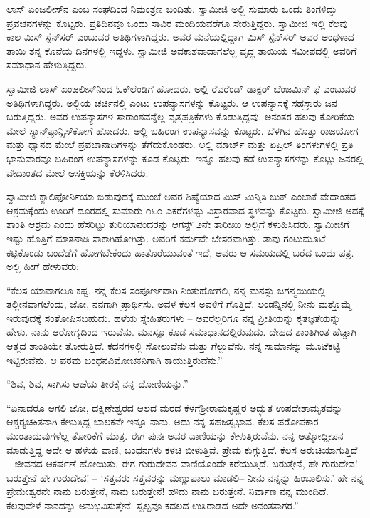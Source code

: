  ಲಾಸ್ ಏಂಜಲೀಸ್‍ನ  ಎಂಬ ಸಂಘದಿಂದ ನಿಮಂತ್ರಣ ಬಂದಿತು. ಸ್ವಾಮೀಜಿ ಅಲ್ಲಿ ಸುಮಾರು ಒಂದು ತಿಂಗಳಿದ್ದು ಪ್ರವಚನಗಳನ್ನು ಕೊಟ್ಟರು. ಪ್ರತಿದಿನವೂ ಒಂದು ಸಾವಿರ ಮಂದಿಯವರೆಗೂ ಸೇರುತ್ತಿದ್ದರು. ಸ್ವಾಮೀಜಿ ಇಲ್ಲಿ ಕೆಲವು ಕಾಲ ಮಿಸ್ ಸ್ಪೆನ್‍ಸರ್ ಎಂಬುವರ ಅತಿಥಿಗಳಾಗಿದ್ದರು. ಅವರ ಮನೆಯಲ್ಲಿದ್ದಾಗ ಮಿಸ್ ಸ್ಪೆನ್‍ಸರ್ ಅವರ ಅಂಧಳಾದ ತಾಯಿ ತನ್ನ ಕೊನೆಯ ದಿನಗಳಲ್ಲಿ ಇದ್ದಳು. ಸ್ವಾಮೀಜಿ ಅವಕಾಶವಾದಾಗಲೆಲ್ಲ ವೃದ್ಧ ತಾಯಿಯ ಸಮೀಪದಲ್ಲಿ ಅವರಿಗೆ ಸಮಾಧಾನ ಹೇಳುತ್ತಿದ್ದರು. 

 ಸ್ವಾಮೀಜಿ ಲಾಸ್ ಏಂಜಲೀಸ್‍ನಿಂದ ಓಕ್‍ಲೆಂಡಿಗೆ ಹೋದರು. ಅಲ್ಲಿ ರೆವರೆಂಡ್ ಡಾಕ್ಟರ್ ಬೆಂಜಮಿನ್ ಫೆ ಎಂಬುವರ ಅತಿಥಿಗಳಾಗಿದ್ದರು. ಅಲ್ಲಿಯ ಚರ್ಚಿನಲ್ಲಿ ಎಂಟು ಉಪನ್ಯಾಸಗಳನ್ನು ಕೊಟ್ಟರು. ಆ ಉಪನ್ಯಾಸಕ್ಕೆ ಸಹಸ್ರಾರು ಜನ ಬರುತ್ತಿದ್ದರು. ಅವರ ಉಪನ್ಯಾಸಗಳ ಸಾರಾಂಶವನ್ನೆಲ್ಲ ವೃತ್ತಪತ್ರಿಕೆಗಳು ಕೊಡುತ್ತಿದ್ದವು. ಅನಂತರ ಹಲವು ಕೋರಿಕೆಯ ಮೇಲೆ ಸ್ಯಾನ್‍ಫ್ರಾನ್ಸಿಸ್‍ಕೋಗೆ ಹೋದರು. ಅಲ್ಲಿ ಬಹಿರಂಗ ಉಪನ್ಯಾಸವನ್ನು ಕೊಟ್ಟರು. ಬೆಳಗಿನ ಹೊತ್ತು ರಾಜಯೋಗ ಮತ್ತು ಧ್ಯಾನದ ಮೇಲೆ ಪ್ರವಚಾನಾದಿಗಳನ್ನು ತೆಗೆದುಕೊಂಡರು. ಅಲ್ಲಿ ಮಾರ್ಚ್ ಮತ್ತು ಏಪ್ರಿಲ್ ತಿಂಗಳುಗಳಲ್ಲಿ ಪ್ರತಿ ಭಾನುವಾರವೂ ಬಹಿರಂಗ ಉಪನ್ಯಾಸಗಳನ್ನು ಕೂಡ ಕೊಟ್ಟರು. ಇನ್ನೂ ಹಲವು ಕಡೆ ಉಪನ್ಯಾಸಗಳನ್ನು ಕೊಟ್ಟು ಜನರಲ್ಲಿ ವೇದಾಂತದ ಮೇಲೆ ಆಸಕ್ತಿಯನ್ನು ಕೆರಳಿಸಿದರು. 

 ಸ್ವಾಮೀಜಿ ಕ್ಯಾಲಿಫೋರ್ನಿಯಾ ಬಿಡುವುದಕ್ಕೆ ಮುಂಚೆ ಅವರ ಶಿಷ್ಯೆಯಾದ ಮಿಸ್ ಮಿನ್ನಿಸಿ ಬುಕ್ ಎಂಬಾಕೆ ವೇದಾಂತದ ಆಶ್ರಮಕ್ಕೆಂದು ಊರಿಗೆ ದೂರದಲ್ಲಿ ಸುಮಾರು ೧೬೦ ಎಕರೆಗಳಷ್ಟು ವಿಸ್ತಾರವಾದ ಸ್ಥಳವನ್ನು ಕೊಟ್ಟರು. ಸ್ವಾಮೀಜಿ ಅದಕ್ಕೆ ಶಾಂತಿ ಆಶ್ರಮ ಎಂದು ಹೆಸರಿಟ್ಟು ತುರಿಯಾನಂದರನ್ನು ಆಗಸ್ಟ್ ೨ನೇ ತಾರೀಖು ಅಲ್ಲಿಗೆ ಕಳುಹಿಸಿದರು. ಸ್ವಾಮೀಜಿಗೆ ಇಷ್ಟು ಹೊತ್ತಿಗೆ ಮಾತನಾಡಿ ಸಾಕಾಗಿಹೋಗಿತ್ತು. ಅವರಿಗೆ ಕರ್ಮವೇ ಬೇಸರವಾಗಿತ್ತು. ತಾವು ಗಂಟುಮೂಟೆ ಕಟ್ಟಿಕೊಂಡು ಬಂದೆಡೆಗೆ ಹೋಗಬೇಕೆಂದು ಹಾತೊರೆಯುವಂತೆ ಇದೆ, ಅವರು ಆ ಸಮಯದಲ್ಲಿ ಬರೆದ ಒಂದು ಪತ್ರ. ಅಲ್ಲಿ ಹೀಗೆ ಹೇಳುವರು: 

 “ಕೆಲಸ ಯಾವಾಗಲೂ ಕಷ್ಟ. ನನ್ನ ಕೆಲಸ ಸಂಪೂರ್ಣವಾಗಿ ನಿಂತುಹೋಗಲಿ, ನನ್ನ ಮನಸ್ಸು ಜಗನ್ಮಯಿಯಲ್ಲಿ ತಲ್ಲೀನವಾಗಲೆಂದು, ಜೋ, ನನಗಾಗಿ ಪ್ರಾರ್ಥಿಸು. ಅವಳ ಕೆಲಸ ಅವಳಿಗೆ ಗೊತ್ತಿದೆ. ಲಂಡನ್ನಿನಲ್ಲಿ ನೀನು ಮತ್ತೊಮ್ಮೆ ಇರುವುದಕ್ಕೆ ಸಂತೋಷಿಸಬಹುದು. ಹಳೆಯ ಸ್ನೇಹಿತರುಗಳು – ಅವರೆಲ್ಲರಿಗೂ ನನ್ನ ಪ್ರೀತಿಯನ್ನು ಕೃತಜ್ಞತೆಯನ್ನು ಹೇಳು. ನಾನು ಆರೋಗ್ಯದಿಂದ ಇರುವೆನು. ಮನಸ್ಸೂ ಕೂಡ ಸಮಾಧಾನದಲ್ಲಿರುವುದು. ದೇಹದ ಶಾಂತಿಗಿಂತ ಹೆಚ್ಚಾಗಿ ಆತ್ಮದ ಶಾಂತಿಯೇ ತೋರುತ್ತಿದೆ. ಕದನಗಳಲ್ಲಿ ಸೋಲುವೆನು ಮತ್ತು ಗೆಲ್ಲುವೆನು. ನನ್ನ ಸಾಮಾನನ್ನು ಮೂಟೆಕಟ್ಟಿ ಇಟ್ಟಿರುವೆನು. ಆ ಪರಮ ಬಂಧನವಿಮೋಚಕನಿಗಾಗಿ ಕಾಯುತ್ತಿರುವೆನು.” 

 “ಶಿವ, ಶಿವ, ಸಾಗಿಸು ಆಚೆಯ ತೀರಕ್ಕೆ ನನ್ನ ದೋಣಿಯನ್ನು.” 

 “ಏನಾದರೂ ಆಗಲಿ ಜೋ, ದಕ್ಷಿಣೇಶ್ವರದ ಆಲದ ಮರದ ಕೆಳಗೆ\break ಶ‍್ರೀರಾಮಕೃಷ್ಣರ ಅದ್ಭುತ ಉಪದೇಶಾಮೃತವನ್ನು ಆಶ್ಚರ‍್ಯಚಕಿತನಾಗಿ ಕೇಳುತ್ತಿದ್ದ ಬಾಲಕನೇ ಇನ್ನೂ ನಾನು. ಅದು ನನ್ನ ಸಹಜಸ್ವಭಾವ. ಕೆಲಸ ಪರೋಪಕಾರ ಮುಂತಾದುವುಗಳೆಲ್ಲ ತೋರಿಕೆಗೆ ಮಾತ್ರ. ಈಗ ಪುನಃ ಅವರ ವಾಣಿಯನ್ನು ಕೇಳುತ್ತಿರುವೆನು. ನನ್ನ ಆತ್ಮೋದ್ದೀಪನ ಮಾಡುತ್ತಿದ್ದ ಅದೇ ಆ ಹಳೆಯ ವಾಣಿ, ಬಂಧನಗಳು ಕಳಚಿ ಬೀಳುತ್ತಿವೆ. ಪ್ರೇಮ ಕುಗ್ಗುತ್ತಿದೆ. ಕೆಲಸ ಅರುಚಿಯಾಗುತ್ತಿದೆ – ಜೀವನದ ಆಕರ್ಷಣೆ ಹೋಯಿತು. ಈಗ ಗುರುದೇವನ ವಾಣಿಯೊಂದೇ ಕರೆಯುತ್ತಿದೆ. ಬರುತ್ತೇನೆ, ಹೇ ಗುರುದೇವ! ಬರುತ್ತೇನೆ ಹೇ ಗುರುದೇವ! – ‘ಸತ್ತವರು ಸತ್ತವರನ್ನು ಮಣ್ಣುಪಾಲು ಮಾಡಲಿ– ನೀನು ನನ್ನನ್ನು ಹಿಂಬಾಲಿಸು.’ ಹೇ ನನ್ನ ಪ್ರೇಮೇಶ್ವರನೇ ನಾನು ಬರುತ್ತೇನೆ, ನಾನು ಬರುತ್ತೇನೆ! ಹೌದು ನಾನು ಬರುತ್ತೇನೆ. ನಿರ್ವಾಣ ನನ್ನ ಮುಂದಿದೆ. ಕೆಲವುವೇಳೆ ನಾನದನ್ನು ಅನುಭವಿಸುತ್ತೇನೆ. ಸ್ವಲ್ಪವೂ ಕದಲದ ಉಸಿರಾಡದ ಅದೇ ಅನಂತಸಾಗರ.” 

